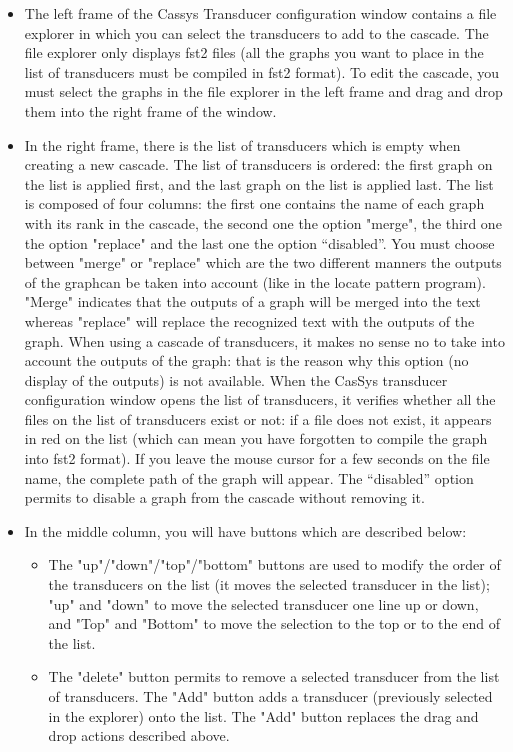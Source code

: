 \begin{itemize}
	\item The left frame of the Cassys Transducer configuration window contains a file explorer in which you can select the transducers to add to the cascade. 
	The file explorer only displays fst2 files (all the graphs you want to place in the list of transducers must be compiled in fst2 format). 
	To edit the cascade, you must select the graphs in the file explorer in the left frame and drag and drop them into the right frame of the window.
	\item In the right frame, there is the list of transducers which is empty when creating a new cascade.
	The list of transducers is ordered: the first graph on the list is applied
	first, and the last graph on the list is applied last. The list is composed of
	four columns: the first one contains	the name of each graph with its rank in
	the cascade, the second one the option "merge", the third one the option
	"replace" and the last one the option ``disabled''.
	You must choose between "merge" or "replace" which are the two different manners the outputs of the graphcan be taken into account (like in the locate pattern program). "Merge" indicates that the outputs of a graph will be merged into the text whereas "replace" will replace the recognized text with the outputs of the graph. When using a cascade of transducers, it makes no sense no to take into account the outputs of the graph: that is the reason why this option (no display of the outputs) is not available.
 	When the CasSys transducer configuration window opens the list of transducers, it verifies whether all the files on the list of transducers exist or not: if a file does not exist, it appears in red on the list (which can mean you have forgotten to compile the graph into fst2 format). 
	If you leave the mouse cursor for a few seconds on the file name, the complete
	path of the graph will appear. The ``disabled'' option permits to disable a
	graph from the cascade without removing it.
	\item In the middle column, you will have buttons which are described below: 
		\begin{itemize}
			\item The "up"/"down"/"top"/"bottom" buttons are used to modify the order of the transducers on the list (it moves the selected transducer in the list); 
			"up" and "down" to move the selected transducer one line up or down, and "Top" and "Bottom" to move the selection to the top or to the end of the list.
			\item  The "delete" button permits to remove a selected transducer from the list of transducers. The "Add" button adds a transducer (previously selected in the explorer) onto the list. The "Add" button replaces the drag and drop actions described above. 

\end{itemize}
\end{itemize}

